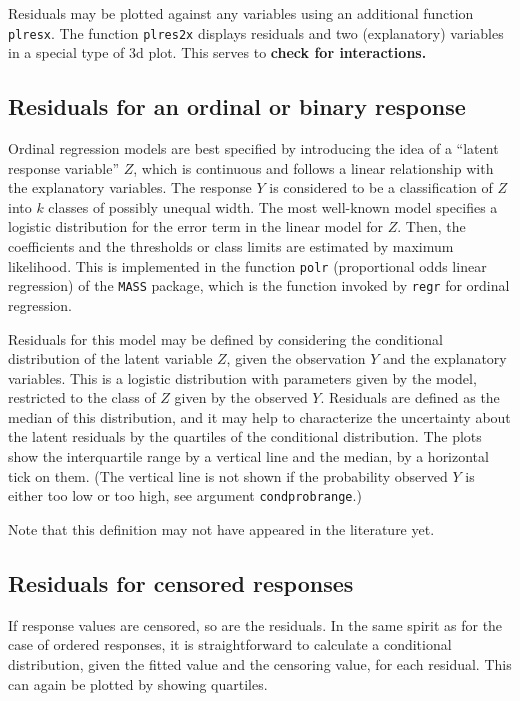 \documentclass{article}
\providecommand{\T}{\texttt}
\providecommand{\ul}{\textbf}
\begin{document}
Residuals may be plotted against any variables using an additional function 
\T{plresx}. The function \T{plres2x} displays residuals and two
(explanatory) variables in a special type of 3d plot. This serves to 
\ul{check for interactions.}

\subsection{Residuals for an ordinal or binary response}
Ordinal regression models are best specified by introducing the idea of a 
``latent response variable'' $Z$, which is continuous and follows a linear
relationship with the explanatory variables. 
The response $Y$ is considered to be a classification of $Z$ into $k$
classes of possibly unequal width. The most well-known model specifies a 
logistic distribution for the error term in the linear model for $Z$.
Then, the coefficients and the thresholds or class limits are estimated by
maximum likelihood. This is implemented in the function \T{polr} 
(proportional odds linear regression) of the \T{MASS} package, 
which is the function invoked by \T{regr} for ordinal regression.

Residuals for this model may be defined by considering the conditional
distribution of the latent variable $Z$, given the observation $Y$ and the
explanatory variables. This is a logistic distribution with parameters
given by the model, restricted to the class of $Z$ given by the observed
$Y$. Residuals are defined as the median of this distribution, and 
it may help to characterize the uncertainty about the latent residuals by 
the quartiles of the conditional distribution.
The plots show the interquartile range by a vertical line and the median,
by a horizontal tick on them. (The vertical line is not shown if the 
probability observed $Y$ is either too low or too high, see argument
\T{condprobrange}.)

Note that this definition may not have appeared in the literature yet.

\subsection{Residuals for censored responses}
If response values are censored, so are the residuals. In the same spirit
as for the case of ordered responses, it is straightforward to calculate 
a conditional distribution, given the fitted value and the censoring value,
for each residual. This can again be plotted by showing quartiles.
\end{document}
